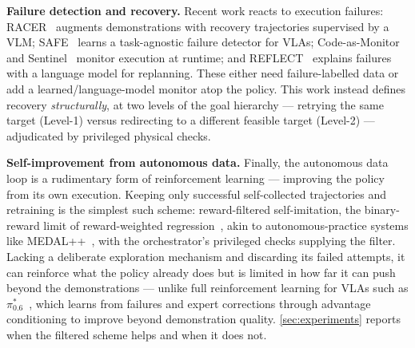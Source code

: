 \textbf{Failure detection and recovery.} Recent work reacts to execution failures: RACER~\cite{dai2024racer} augments demonstrations with recovery trajectories supervised by a VLM; SAFE~\cite{gu2025safe} learns a task-agnostic failure detector for VLAs; Code-as-Monitor~\cite{zhou2024codeasmonitor} and Sentinel~\cite{agia2024sentinel} monitor execution at runtime; and REFLECT~\cite{liu2023reflect} explains failures with a language model for replanning. These either need failure-labelled data or add a learned/language-model monitor atop the policy. This work instead defines recovery \emph{structurally}, at two levels of the goal hierarchy --- retrying the same target (Level-1) versus redirecting to a different feasible target (Level-2) --- adjudicated by privileged physical checks.

\textbf{Self-improvement from autonomous data.} Finally, the autonomous data loop is a rudimentary form of reinforcement learning --- improving the policy from its own execution. Keeping only successful self-collected trajectories and retraining is the simplest such scheme: reward-filtered self-imitation, the binary-reward limit of reward-weighted regression~\cite{peters2007rwr}, akin to autonomous-practice systems like MEDAL++~\cite{sharma2023selfimproving}, with the orchestrator's privileged checks supplying the filter. Lacking a deliberate exploration mechanism and discarding its failed attempts, it can reinforce what the policy already does but is limited in how far it can push beyond the demonstrations --- unlike full reinforcement learning for VLAs such as $\pi^{*}_{0.6}$~\cite{pi2025pistar06}, which learns from failures and expert corrections through advantage conditioning to improve beyond demonstration quality. \cref{sec:experiments} reports when the filtered scheme helps and when it does not.
